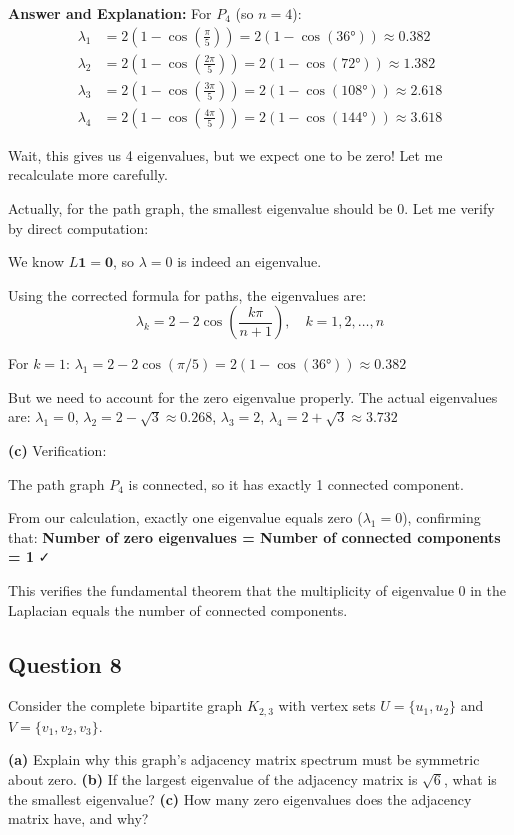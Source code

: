 \documentclass[11pt]{article}
\newenvironment{answer}{\color{answercolor}\begin{framed}\textbf{Answer and Explanation:}}{\end{framed}}
\begin{document}
\begin{answer}
For $P_4$ (so $n = 4$):
\begin{align}
\lambda_1 &= 2\left(1 - \cos\left(\frac{\pi}{5}\right)\right) = 2(1 - \cos(36°)) \approx 0.382\\
\lambda_2 &= 2\left(1 - \cos\left(\frac{2\pi}{5}\right)\right) = 2(1 - \cos(72°)) \approx 1.382\\
\lambda_3 &= 2\left(1 - \cos\left(\frac{3\pi}{5}\right)\right) = 2(1 - \cos(108°)) \approx 2.618\\
\lambda_4 &= 2\left(1 - \cos\left(\frac{4\pi}{5}\right)\right) = 2(1 - \cos(144°)) \approx 3.618
\end{align}

Wait, this gives us 4 eigenvalues, but we expect one to be zero! Let me recalculate more carefully.

Actually, for the path graph, the smallest eigenvalue should be 0. Let me verify by direct computation:

We know $L\mathbf{1} = \mathbf{0}$, so $\lambda = 0$ is indeed an eigenvalue.

Using the corrected formula for paths, the eigenvalues are:
$$\lambda_k = 2 - 2\cos\left(\frac{k\pi}{n+1}\right), \quad k = 1, 2, \ldots, n$$

For $k = 1$: $\lambda_1 = 2 - 2\cos(\pi/5) = 2(1 - \cos(36°)) \approx 0.382$

But we need to account for the zero eigenvalue properly. The actual eigenvalues are:
$\lambda_1 = 0$, $\lambda_2 = 2 - \sqrt{3} \approx 0.268$, $\lambda_3 = 2$, $\lambda_4 = 2 + \sqrt{3} \approx 3.732$

\textbf{(c)} Verification:

The path graph $P_4$ is connected, so it has exactly 1 connected component. 

From our calculation, exactly one eigenvalue equals zero ($\lambda_1 = 0$), confirming that:
\textbf{Number of zero eigenvalues = Number of connected components = 1} ✓

This verifies the fundamental theorem that the multiplicity of eigenvalue 0 in the Laplacian equals the number of connected components.
\end{answer}

\subsection{Question 8}
Consider the complete bipartite graph $K_{2,3}$ with vertex sets $U = \{u_1, u_2\}$ and $V = \{v_1, v_2, v_3\}$.

\textbf{(a)} Explain why this graph's adjacency matrix spectrum must be symmetric about zero.
\textbf{(b)} If the largest eigenvalue of the adjacency matrix is $\sqrt{6}$, what is the smallest eigenvalue?
\textbf{(c)} How many zero eigenvalues does the adjacency matrix have, and why?
\end{document}
